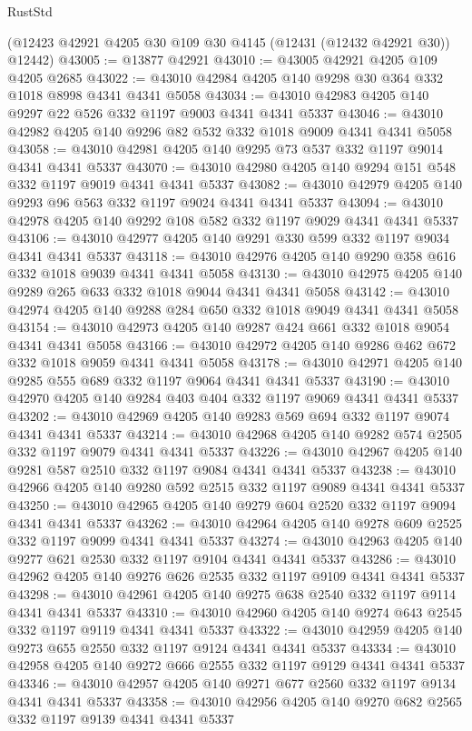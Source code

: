 \begin{lexlean}{RustStd}
\begin{coremodule}
    (@12423 @42921 @4205 @30 @109 @30 @4145 (@12431 (@12432 @42921 @30)) @12442)
@43005 := @13877 @42921
@43010 := @43005 @42921 @4205 @109 @4205 @2685
@43022 := @43010 @42984 @4205 @140 @9298 @30 @364 @332 @1018 @8998 @4341 @4341 @5058
@43034 := @43010 @42983 @4205 @140 @9297 @22 @526 @332 @1197 @9003 @4341 @4341 @5337
@43046 := @43010 @42982 @4205 @140 @9296 @82 @532 @332 @1018 @9009 @4341 @4341 @5058
@43058 := @43010 @42981 @4205 @140 @9295 @73 @537 @332 @1197 @9014 @4341 @4341 @5337
@43070 := @43010 @42980 @4205 @140 @9294 @151 @548 @332 @1197 @9019 @4341 @4341 @5337
@43082 := @43010 @42979 @4205 @140 @9293 @96 @563 @332 @1197 @9024 @4341 @4341 @5337
@43094 := @43010 @42978 @4205 @140 @9292 @108 @582 @332 @1197 @9029 @4341 @4341 @5337
@43106 := @43010 @42977 @4205 @140 @9291 @330 @599 @332 @1197 @9034 @4341 @4341 @5337
@43118 := @43010 @42976 @4205 @140 @9290 @358 @616 @332 @1018 @9039 @4341 @4341 @5058
@43130 := @43010 @42975 @4205 @140 @9289 @265 @633 @332 @1018 @9044 @4341 @4341 @5058
@43142 := @43010 @42974 @4205 @140 @9288 @284 @650 @332 @1018 @9049 @4341 @4341 @5058
@43154 := @43010 @42973 @4205 @140 @9287 @424 @661 @332 @1018 @9054 @4341 @4341 @5058
@43166 := @43010 @42972 @4205 @140 @9286 @462 @672 @332 @1018 @9059 @4341 @4341 @5058
@43178 := @43010 @42971 @4205 @140 @9285 @555 @689 @332 @1197 @9064 @4341 @4341 @5337
@43190 := @43010 @42970 @4205 @140 @9284 @403 @404 @332 @1197 @9069 @4341 @4341 @5337
@43202 := @43010 @42969 @4205 @140 @9283 @569 @694 @332 @1197 @9074 @4341 @4341 @5337
@43214 := @43010 @42968 @4205 @140 @9282 @574 @2505 @332 @1197 @9079 @4341 @4341 @5337
@43226 := @43010 @42967 @4205 @140 @9281 @587 @2510 @332 @1197 @9084 @4341 @4341 @5337
@43238 := @43010 @42966 @4205 @140 @9280 @592 @2515 @332 @1197 @9089 @4341 @4341 @5337
@43250 := @43010 @42965 @4205 @140 @9279 @604 @2520 @332 @1197 @9094 @4341 @4341 @5337
@43262 := @43010 @42964 @4205 @140 @9278 @609 @2525 @332 @1197 @9099 @4341 @4341 @5337
@43274 := @43010 @42963 @4205 @140 @9277 @621 @2530 @332 @1197 @9104 @4341 @4341 @5337
@43286 := @43010 @42962 @4205 @140 @9276 @626 @2535 @332 @1197 @9109 @4341 @4341 @5337
@43298 := @43010 @42961 @4205 @140 @9275 @638 @2540 @332 @1197 @9114 @4341 @4341 @5337
@43310 := @43010 @42960 @4205 @140 @9274 @643 @2545 @332 @1197 @9119 @4341 @4341 @5337
@43322 := @43010 @42959 @4205 @140 @9273 @655 @2550 @332 @1197 @9124 @4341 @4341 @5337
@43334 := @43010 @42958 @4205 @140 @9272 @666 @2555 @332 @1197 @9129 @4341 @4341 @5337
@43346 := @43010 @42957 @4205 @140 @9271 @677 @2560 @332 @1197 @9134 @4341 @4341 @5337
@43358 := @43010 @42956 @4205 @140 @9270 @682 @2565 @332 @1197 @9139 @4341 @4341 @5337

\end{coremodule}
\end{lexlean}
